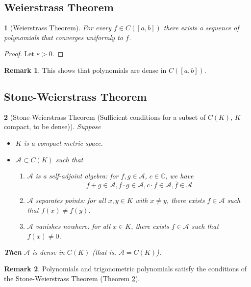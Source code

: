 \documentclass[11pt]{article}
\numberwithin{equation}{section}
\theoremstyle{plain}
\newtheorem{theorem}{\color{ForestGreen}{\textbf{Theorem}}}[section]
\theoremstyle{definition}
\newtheorem*{remark}{Remark}
\def\ss{\subset}
\newcommand{\1}{\mathbbm 1}
\newcommand{\e}{\varepsilon}
\newcommand{\CC}{\mathbb C}
\newcommand{\aA}{\mathcal A}
\begin{document}
\subsection{Weierstrass Theorem}

\begin{theorem}[Weierstrass Theorem]
	For every $f \in C([a,b])$ there exists a sequence of polynomials that converges uniformly to $f$. 
\end{theorem}
\begin{proof}
	Let $\e > 0$. 

\end{proof}


\begin{remark}
	This shows that polynomials are dense in $C([a,b])$. 
\end{remark}


\subsection{Stone-Weierstrass Theorem}

\begin{theorem}[Stone-Weierstrass Theorem (Sufficient conditions for a subset of $C(K)$, $K$ compact, to be dense)]\label{thm:stone-weierstrass}
	Suppose 
	\begin{itemize}
		\item $K$ is a compact metric space.
		\item $\aA \ss C(K)$ such that
		\begin{enumerate}
			\item $\aA$ is a self-adjoint algebra: for $f,g \in \aA$, $c \in \CC$, we have
			\begin{equation}
				f+g \in \aA, f \cdot g \in \aA, c \cdot f \in \aA, \bar{f} \in \aA
			\end{equation}
			\item $\aA$ separates points: for all $x,y \in K$ with $x \neq y$, there exists $f \in \aA$ such that $f(x) \neq f(y)$. 
			\item $\aA$ vanishes nowhere: for all $x \in K$, there exists $f \in \aA$ such that $f(x) \neq 0$. 
		\end{enumerate}
	\end{itemize}
	\textbf{Then} $\aA$ is dense in $C(K)$ (that is, $\bar{\aA} = C(K)$). 
\end{theorem}

\begin{remark}
	Polynomials and trigonometric polynomials satisfy the conditions of the Stone-Weierstrass Theorem (Theorem \ref{thm:stone-weierstrass}).

\end{remark}
\end{document}
